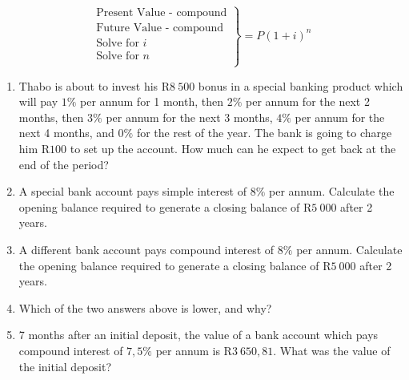 \begin{equation*}
\left.\begin{array}{l}
\mbox{Present Value - compound}\\
\mbox{Future Value - compound} \\
\mbox{Solve for $i$}\\
\mbox{Solve for $n$}\\
\end{array}\right\}= P (1+i)^n
\end{equation*}


\begin{eocexercises}{}
\begin{enumerate}
\item{Thabo is about to invest his R$8~500$ bonus in a special banking product which will pay $1\%$ per annum for 1 month, then $2\%$ per annum for the next 2 months, then $3\%$ per annum for the next 3 months, $4\%$ per annum for the next 4 months, and $0\%$ for the rest of the year. The bank is going to charge him R$100$ to set up the account. How much can he expect to get back at the end of the period?}

\item{A special bank account pays simple interest of $8\%$ per annum. Calculate the opening balance required to generate a closing balance of R$5~000$ after 2 years.}

\item{A different bank account pays compound interest of $8\%$ per annum. Calculate the opening balance required to generate a closing balance of R$5~000$ after 2 years.}

\item{Which of the two answers above is lower, and why?}

\item{7 months after an initial deposit, the value of a bank account which pays compound interest of $7,5\%$ per annum is R$3~650,81$. What was the value of the initial deposit?}



\end{enumerate}
\end{eocexercises}
